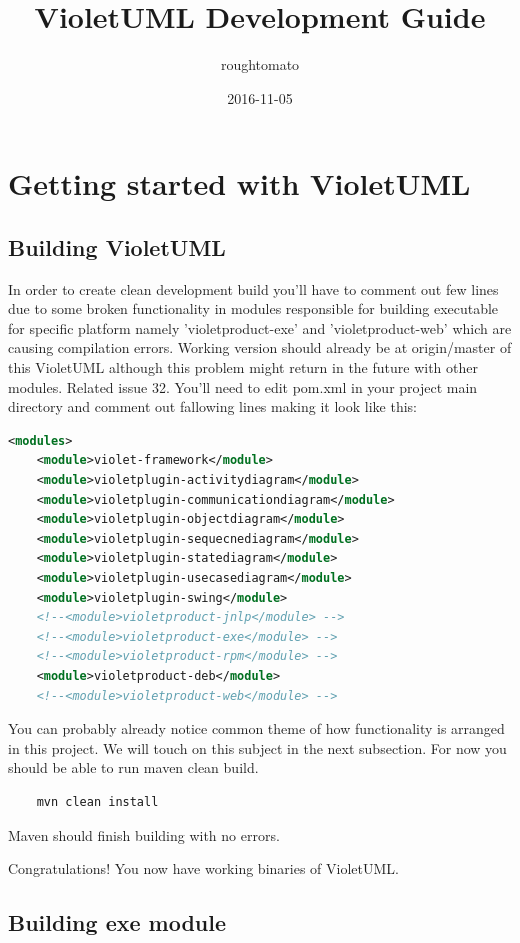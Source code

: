 \documentclass{article}
\title{VioletUML Development Guide}
\date{2016-11-05}
\author{roughtomato}
\begin{document}
  \maketitle
  \newpage

\section{Getting started with VioletUML}
\subsection{Building VioletUML}

In order to create clean development build you'll have to comment out few lines due to some broken functionality in modules responsible for
building executable for specific platform namely 'violetproduct-exe' and 'violetproduct-web' which are causing compilation errors.
Working version should already be at origin/master of this VioletUML although this problem might return in the future with other modules.
Related issue 32. You'll need to edit pom.xml in your project main directory and comment out fallowing lines making it look like this:
\begin{lstlisting}[language=XML]
<modules>
	<module>violet-framework</module>
	<module>violetplugin-activitydiagram</module>
	<module>violetplugin-communicationdiagram</module>
	<module>violetplugin-objectdiagram</module>
	<module>violetplugin-sequecnediagram</module>
	<module>violetplugin-statediagram</module>
	<module>violetplugin-usecasediagram</module>
	<module>violetplugin-swing</module>
	<!--<module>violetproduct-jnlp</module> -->
	<!--<module>violetproduct-exe</module> -->
	<!--<module>violetproduct-rpm</module> -->
	<module>violetproduct-deb</module>
	<!--<module>violetproduct-web</module> -->
\end{lstlisting}

You can probably already notice common theme of how functionality is arranged in this project. We will touch on this subject in the next subsection.
For now you should be able to run maven clean build.
\begin{lstlisting}
	mvn clean install
\end{lstlisting}
Maven should finish building with no errors.

Congratulations! You now have working binaries of VioletUML.

\subsection{Building exe module}
\end{document}
